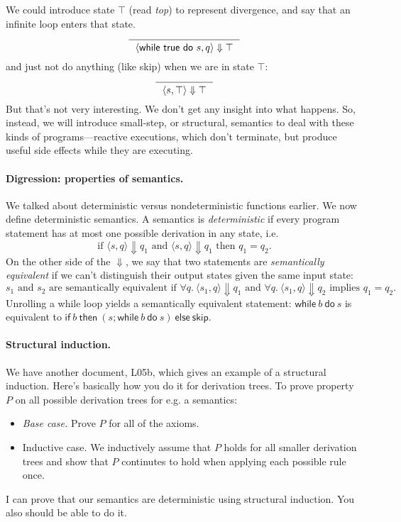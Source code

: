 \documentclass[11pt]{article}
\begin{document}
We could introduce state $\top$ (read \emph{top}) to represent divergence, and say that an infinite loop enters that state.
\[
\begin{prooftree}
  \infer0{~~\langle \mathsf{while} ~\mathsf{true}~ \mathsf{do} ~s,q\rangle \Downarrow \top~~}
\end{prooftree}
\]
and just not do anything (like \textsf{skip}) when we are in state $\top$:
\[
\begin{prooftree}
  \infer0{~~\langle s, \top \rangle \Downarrow \top~~}
\end{prooftree}
\]
But that's not very interesting. We don't get any insight into what happens.
So, instead, we will introduce small-step, or structural, semantics to deal
with these kinds of programs---reactive executions, which don't terminate,
but produce useful side effects while they are executing.

\paragraph{Digression: properties of semantics.} We talked about deterministic versus nondeterministic functions earlier. We now define deterministic semantics. A semantics is \emph{deterministic} if every program statement has at most one possible derivation in any state, i.e.
\[ \mbox{if } \langle s, q \rangle \Downarrow q_1 \mbox{ and } \langle s, q \rangle \Downarrow q_1 \mbox{ then } q_1 = q_2. \]
On the other side of the $\Downarrow$, we say that two statements are \emph{semantically equivalent} if we can't distinguish their output states given the same input state:
\[ s_1 \mbox{ and } s_2 \mbox{ are semantically equivalent if } \forall q.~ \langle s_1, q \rangle \Downarrow q_1 \mbox{ and } \forall q.~ \langle s_1, q \rangle \Downarrow q_2 \mbox{ implies } q_1 = q_2. \]
Unrolling a while loop yields a semantically equivalent statement: $\mathsf{while} ~b~ \mathsf{do} ~s$ is equivalent to $\mathsf{if } ~b~ \mathsf{then~} (s; \mathsf{while} ~b~ \mathsf{do} ~s)~ \mathsf{else~skip}$.

\paragraph{Structural induction.} We have another document, L05b, which gives an example of a structural induction. Here's basically how you do it for derivation trees. To prove property $P$ on all possible derivation trees for e.g. a semantics:
\begin{itemize}[noitemsep]
\item \emph{Base case.} Prove $P$ for all of the axioms.
\item {Inductive case.} We inductively assume that $P$ holds for all smaller derivation trees and show that $P$ continutes to hold when applying each possible rule once.
\end{itemize}
I can prove that our semantics are deterministic using structural induction.
You also should be able to do it.
\end{document}
